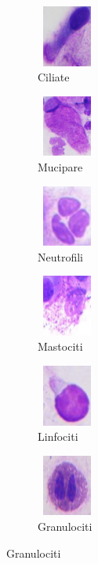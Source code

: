 \documentclass[italian,10pt,a4paper]{article}
\begin{document}
					\begin{figure}[h]
						\centering
						\begin{subfigure}[h]{70px}
							\centering
							\includegraphics[width=2cm, height=2cm]{img/ciliate.jpg}
							\caption{Ciliate}
							\label{fig:image1}
						\end{subfigure}
						\hfill
						\begin{subfigure}[h]{70px}
							\centering
							\includegraphics[width=2cm, height=2cm]{img/mucipare.jpg}
							\caption{Mucipare}
							\label{fig:image2}
						\end{subfigure}
						\hfill
						\begin{subfigure}[h]{70px}
							\centering
							\includegraphics[width=2cm, height=2cm]{img/neutrofili.jpg}
							\caption{Neutrofili}
							\label{fig:image3}
						\end{subfigure}
		
						\label{fig:multiple_images1}
						\begin{subfigure}[h]{70px}
							\centering
							\includegraphics[width=2cm, height=2cm]{img/mast.jpg}
							\caption{Mastociti}
							\label{fig:image4}
						\end{subfigure}
						\hfill
						\begin{subfigure}[h]{70px}
							\centering
							\includegraphics[width=2cm, height=2cm]{img/linfociti.jpg}
							\caption{Linfociti}
							\label{fig:image5}
						\end{subfigure}
						\hfill
						\begin{subfigure}[h]{70px}
							\centering
							\includegraphics[width=2cm, height=2cm]{img/eosinophil.jpg}
							\caption{Granulociti}
							\label{fig:image6}
						\end{subfigure}
		

\end{figure}
\end{document}
